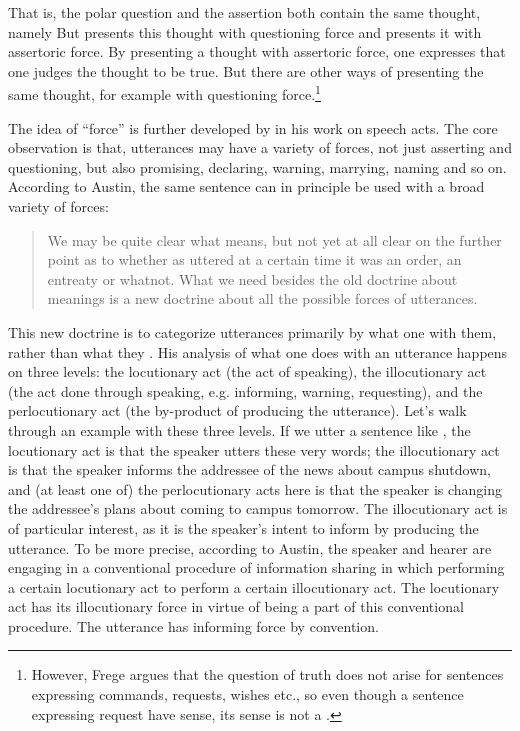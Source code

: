 That is, the polar question  and the assertion  both contain the same thought, namely   But  presents this thought with questioning force and  presents it with assertoric force. By presenting a thought with assertoric force, one expresses that one judges the thought to be true. But there are other ways of presenting the same thought, for example with questioning force.\footnote{However, Frege argues that the question of truth does not arise for sentences expressing commands, requests, wishes etc., so even though a sentence expressing request have sense, its sense is not a .}

The idea of ``force'' is further developed by \textcite{austin1975things} in his work on speech acts. The core observation is that, utterances may have a variety of forces, not just asserting and questioning, but also promising, declaring, warning, marrying, naming and so on. According to Austin, the same sentence can in principle be used with a broad variety of forces:

\begin{quote}
    
We may be quite clear what  means, but not yet at all clear on the further point as to whether as uttered at a certain time it was an order, an entreaty or whatnot. What we need besides the old doctrine about meanings is a new doctrine about all the possible forces of utterances.

\hfill \cite[251]{austin1975things}
\end{quote}

This new doctrine is to categorize utterances primarily by what one  with them, rather than what they . His analysis of what one does with an utterance happens on three levels: the locutionary act (the act of speaking), the illocutionary act (the act done through speaking, e.g. informing, warning, requesting), and the perlocutionary act (the by-product of producing the utterance). Let’s walk through an example with these three levels. If we utter a sentence like , the locutionary act is that the speaker utters these very words; the illocutionary act is that the speaker informs the addressee of the news about campus shutdown, and (at least one of) the perlocutionary acts here is that the speaker is changing the addressee’s plans about coming to campus tomorrow. The illocutionary act is of particular interest, as it is the speaker’s intent to inform by producing the utterance. To be more precise, according to Austin, the speaker and hearer are engaging in a conventional procedure of information sharing in which performing a certain locutionary act  to perform a certain illocutionary act. The locutionary act has its illocutionary force in virtue of being a part of this conventional procedure. The utterance has informing force by convention.

